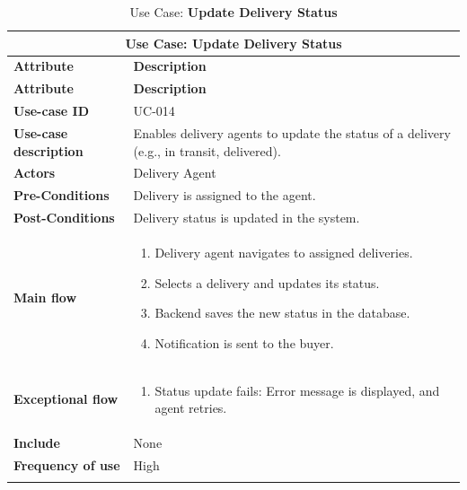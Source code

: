 \documentclass[12pt]{report}
\begin{document}
\begin{appendices}
	\begin{longtable}[H]{|l|p{9cm}||}
		\hline
		\multicolumn{2}{|c||}{\textbf{Use Case: Update Delivery Status}}                                                          \\
		\hline
		\textbf{Attribute}            & \textbf{Description}                                                                      \\
		\hline
		\endfirsthead
		\hline
		\textbf{Attribute}            & \textbf{Description}                                                                      \\
		\hline
		\endhead
		\textbf{Use-case ID}          & UC-014                                                                                    \\
		\hline
		\textbf{Use-case description} & Enables delivery agents to update the status of a delivery (e.g., in transit, delivered). \\
		\hline
		\textbf{Actors}               & Delivery Agent                                                                            \\
		\hline
		\textbf{Pre-Conditions}       & Delivery is assigned to the agent.                                                        \\
		\hline
		\textbf{Post-Conditions}      & Delivery status is updated in the system.                                                 \\
		\hline
		\textbf{Main flow}            & \begin{enumerate}
			                                \item Delivery agent navigates to assigned deliveries.
			                                \item Selects a delivery and updates its status.
			                                \item Backend saves the new status in the database.
			                                \item Notification is sent to the buyer.
		                                \end{enumerate}                                     \\
		\hline
		\textbf{Exceptional flow}     & \begin{enumerate}
			                                \item Status update fails: Error message is displayed, and agent retries.
		                                \end{enumerate}                  \\
		\hline
		\textbf{Include}              & None                                                                                      \\
		\hline
		\textbf{Frequency of use}     & High                                                                                      \\
		\hline
		\hline
		\caption{Use Case: \textbf{Update Delivery Status}}\label{tab:tableUpdateStatus}
	\end{longtable}
\end{appendices}
\end{document}
